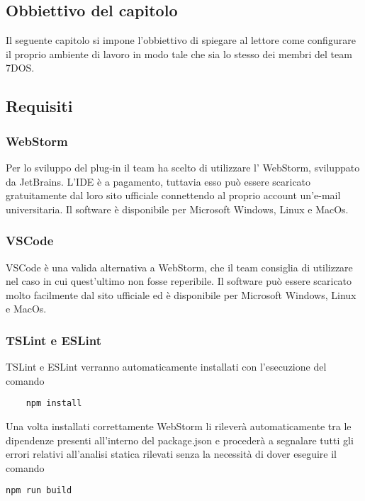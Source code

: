 \subsection{Obbiettivo del capitolo}
Il seguente capitolo si impone l'obbiettivo di spiegare al lettore come configurare il proprio ambiente di lavoro in modo tale che sia lo stesso dei membri del team 7DOS.  
\subsection{Requisiti}

\subsubsection{WebStorm}
Per lo sviluppo del plug-in il team ha scelto di utilizzare l' WebStorm, sviluppato da JetBrains. L'IDE è a pagamento, tuttavia esso può essere scaricato gratuitamente dal loro sito ufficiale connettendo al proprio account un'e-mail universitaria.
Il software è disponibile per Microsoft Windows, Linux e MacOs.
\subsubsection{VSCode}
VSCode è una valida alternativa a WebStorm, che il team consiglia di utilizzare nel caso in cui quest'ultimo non fosse reperibile.
Il software può essere scaricato molto facilmente dal sito ufficiale ed è disponibile per Microsoft Windows, Linux e MacOs.
\subsubsection{TSLint e ESLint}
TSLint e ESLint verranno automaticamente installati con l'esecuzione del comando
\begin{verbatim}
	npm install
\end{verbatim}
Una volta installati correttamente WebStorm li rileverà automaticamente tra le dipendenze presenti all'interno del package.json e procederà a segnalare tutti gli errori relativi all'analisi statica rilevati senza la necessità di dover eseguire il comando
\begin{verbatim}
npm run build
\end{verbatim}

\pagebreak